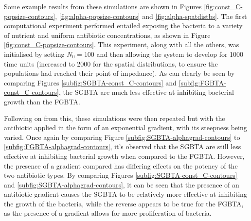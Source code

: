 \documentclass[a4paper,12pt]{article}
\begin{document}
Some example results from these simulations are shown in Figures \ref{fig:const_C-popsize-contours}, \ref{fig:alpha-popsize-contours} and \ref{fig:alpha-spatdistbs}.  The first 
computational experiment performed entailed exposing the bacteria to a variety of nutrient and uniform antibiotic concentrations, as shown in Figure \ref{fig:const_C-popsize-contours}.  
This experiment, along with all the others, was initialised by setting $N_0 = 100$ and then allowing the system to develop for 1000 time units (increased to 2000 for the spatial 
distributions, to ensure the populations had reached their point of impedance).  As can clearly be seen by comparing Figures \ref{subfig:SGBTA-const_C-contours} and 
\ref{subfig:FGBTA-const_C-contours}, the SGBTA are much less effective at inhibiting bacterial growth than the FGBTA.

Following on from this, these simulations were then repeated but with the antibiotic applied in the form of an exponential gradient, with its steepness being varied.  Once 
again by comparing Figure \ref{subfig:SGBTA-alphagrad-contours} to \ref{subfig:FGBTA-alphagrad-contours}, it's observed that the SGBTA are still less effective at inhibiting 
bacterial growth when compared to the FGBTA.  However, the presence of a gradient compared has differing effects on the potency of the two antibiotic types.  By comparing Figures 
\ref{subfig:SGBTA-const_C-contours} and \ref{subfig:SGBTA-alphagrad-contours}, it can be seen that the presence of an antibiotic gradient causes the SGBTA to be relatively more 
effective at inhibiting the growth of the bacteria, while the reverse appears to be true for the FGBTA, as the presence of a gradient allows for more proliferation of bacteria.
\end{document}
